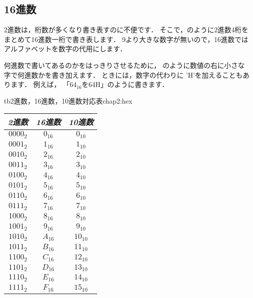 \subsection{16進数}

2進数は，桁数が多くなり書き表すのに不便です．
そこで，のように2進数4桁をまとめて16進数一桁で書き表します．
9より大きな数字が無いので，16進数ではアルファベットを数字の代用にします．

何進数で書いてあるのかをはっきりさせるために，
のように数値の右に小さな字で何進数かを書き加えます．
ときには，数字の代わりに
'H'を加えることもあります．
例えば，
「$64_{16}$を64H」のように書きます．

\begin{mytable}{tb}{2進数，16進数，10進数対応表}{chap2:hex}
{\small\begin{tabular}{ c | c | c }
\hline
\hline
\emph{2進数} & \emph{16進数} & \emph{10進数} \\
\hline
$0000_2$ & $0_{16}$ & $0_{10}$ \\
$0001_2$ & $1_{16}$ & $1_{10}$ \\
$0010_2$ & $2_{16}$ & $2_{10}$ \\
$0011_2$ & $3_{16}$ & $3_{10}$ \\
$0100_2$ & $4_{16}$ & $4_{10}$ \\
$0101_2$ & $5_{16}$ & $5_{10}$ \\
$0110_2$ & $6_{16}$ & $6_{10}$ \\
$0111_2$ & $7_{16}$ & $7_{10}$ \\
$1000_2$ & $8_{16}$ & $8_{10}$ \\
$1001_2$ & $9_{16}$ & $9_{10}$ \\
$1010_2$ & $A_{16}$ & $10_{10}$ \\
$1011_2$ & $B_{16}$ & $11_{10}$ \\
$1100_2$ & $C_{16}$ & $12_{10}$ \\
$1101_2$ & $D_{16}$ & $13_{10}$ \\
$1110_2$ & $E_{16}$ & $14_{10}$ \\
$1111_2$ & $F_{16}$ & $15_{10}$ \\
\end{tabular}}
\end{mytable}

